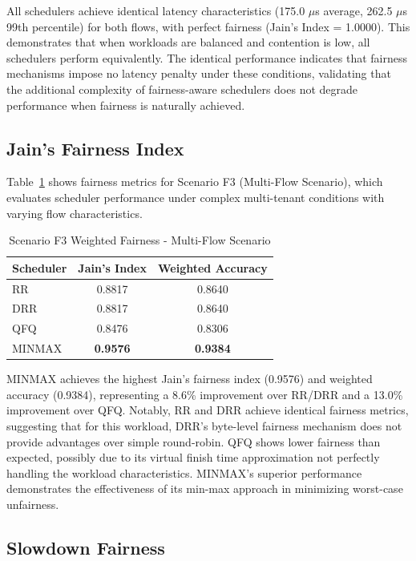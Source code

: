 \documentclass[11pt]{article}
\begin{document}
All schedulers achieve identical latency characteristics (175.0 $\mu$s average, 262.5 $\mu$s 99th percentile) for both flows, with perfect fairness (Jain's Index = 1.0000). This demonstrates that when workloads are balanced and contention is low, all schedulers perform equivalently. The identical performance indicates that fairness mechanisms impose no latency penalty under these conditions, validating that the additional complexity of fairness-aware schedulers does not degrade performance when fairness is naturally achieved.

\subsection{Jain's Fairness Index}

Table~\ref{tab:f3-fairness} shows fairness metrics for Scenario F3 (Multi-Flow Scenario), which evaluates scheduler performance under complex multi-tenant conditions with varying flow characteristics.

\begin{table}[h]
\centering
\caption{Scenario F3 Weighted Fairness - Multi-Flow Scenario}
\label{tab:f3-fairness}
\begin{tabular}{lcc}
\toprule
Scheduler & Jain's Index & Weighted Accuracy \\
\midrule
RR   & 0.8817 & 0.8640 \\
DRR  & 0.8817 & 0.8640 \\
QFQ  & 0.8476 & 0.8306 \\
MINMAX & \textbf{0.9576} & \textbf{0.9384} \\
\bottomrule
\end{tabular}
\end{table}

MINMAX achieves the highest Jain's fairness index (0.9576) and weighted accuracy (0.9384), representing a 8.6\% improvement over RR/DRR and a 13.0\% improvement over QFQ. Notably, RR and DRR achieve identical fairness metrics, suggesting that for this workload, DRR's byte-level fairness mechanism does not provide advantages over simple round-robin. QFQ shows lower fairness than expected, possibly due to its virtual finish time approximation not perfectly handling the workload characteristics. MINMAX's superior performance demonstrates the effectiveness of its min-max approach in minimizing worst-case unfairness.

\subsection{Slowdown Fairness}
\end{document}
